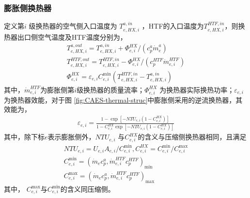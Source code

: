 \subsubsection{膨胀侧换热器}
定义第$i$ 级换热器的空气侧入口温度为 $T_{e,HX,i}^{a,in}$ ，HTF的入口温度为$T_{e,HX,i}^{HTF,in}$，则换热器出口侧空气温度及HTF温度分别为，
\begin{subequations}
\label{eq:he-turb-temp-out}
\begin{gather}
T_{e,HX,i}^{a,out} = T_{e,HX,i}^{a,in} + \Phi _{e,i}^{HX}/({c_p^a\dot m_e^a})\label{equ:he-turb-temp-air-out}\\
T_{e,HX,i}^{HTF,out} = T_{e,HX,i}^{HTF,in} - \Phi _{e,i}^{HX}/({c_p^{HTF}\dot m_{e,i}^{HTF}}) \label{equ:he-turb-temp-HTF-out}\\
\Phi _{e,i}^{HX} = {\varepsilon _{e,i}}C_{e,i}^{\min }({T_{e,HX,i}^{HTF,in} - T_{e,HX,i}^{a,in}})\label{equ:he-turb-thermal}
\end{gather}
\end{subequations}
其中，$\dot m_{e,i}^{HTF}$为膨胀侧第$i$级换热器的质量流率；$\Phi _{e,i}^{HX}$ 为换热器实际换热功率；${\varepsilon _{e,i}}$ 为换热器效能，对于图
\ref{fig:CAES-thermal-struc}中膨胀侧采用的逆流换热器，其效能为\cite{Heat-mass-transfer-11}，
\begin{subequations}
\begin{gather}
{\varepsilon _{e,i}} = \frac{{1 - \exp [{- NT{U_{e,i}}({1 - C_{e,i}^{HX}})}]}}{{1 - C_{e,i}^{HX}\exp [{- NT{U_{e,i}}({1 - C_{e,i}^{HX}})}]}}\label{equ:he-eff-1}
\end{gather}
\end{subequations}
其中，除下标$e$表示膨胀侧外，$NT{U_{e,i}}$ 与$C_{e,i}^{HX}$的含义与压缩侧换热器相同，且满足
\begin{subequations}
\begin{gather}
NT{U_{e,i}} = U_{e,i}A_{e,i}/C_{e,i}^{\min }, C_{e,i}^{HX} = C_{e,i}^{\min }/C_{e,i}^{\max }\label{equ:he-turb-NTU-C}\\
C_{e,i}^{\min } = {({{{\dot m}_e}c_p^a,\dot m_{e,i}^{HTF}c_p^{HTF}})_{\min }}\label{equ:he-turb-Cmin}\\
C_{e,i}^{\max } = {({{{\dot m}_e}c_p^a,\dot m_{e,i}^{HTF}c_p^{HTF}})_{\max }}\label{equ:he-turb-Cmax}
\end{gather}
\end{subequations}
其中， $C_{e,i}^{\max }$与$C_{e,i}^{\min }$的含义同压缩侧。

